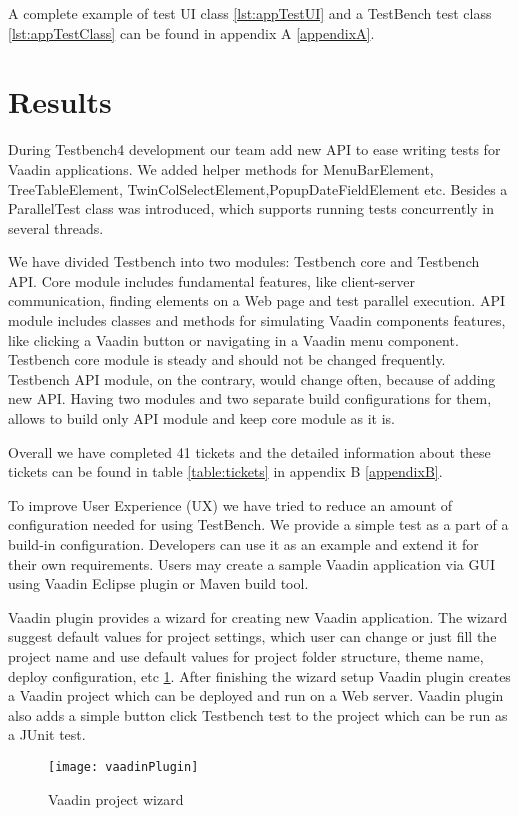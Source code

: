 A complete example of test UI class \ref{lst:appTestUI}  and a TestBench test
class \ref{lst:appTestClass} can be found in appendix A \ref{appendixA}.

\section {Results}
During Testbench4 development our team add new API to ease writing tests for
Vaadin applications. We added helper methods for MenuBarElement,
TreeTableElement, TwinColSelectElement,PopupDateFieldElement etc. Besides a
ParallelTest class was introduced, which supports running tests concurrently in
several threads.

We have divided Testbench into two modules: Testbench core and Testbench API.
Core module includes fundamental features, like client-server communication, finding
elements on a Web page and test parallel execution. API module includes
classes and methods for simulating Vaadin components features, like clicking a
Vaadin button or navigating in a Vaadin menu component. Testbench core
module is steady and should not be changed frequently. Testbench API
module, on the contrary, would change often, because of adding new API. Having
two modules and two separate build configurations for them, allows to build only
API module and keep core module as it is. 

Overall we have completed 41 tickets
and the detailed information about these tickets can be found in table \ref{table:tickets} in appendix B \ref{appendixB}.

To improve User Experience (UX) we have tried to reduce an amount of
configuration needed for using TestBench. We provide a simple test as a
part of a build-in configuration.
Developers can use it as an example and extend it for their own requirements. Users may create a sample
Vaadin application via GUI using Vaadin Eclipse plugin or Maven build tool.

Vaadin plugin provides a wizard for creating new Vaadin application. The wizard
suggest default values for project settings, which user can change or just fill
the project name and use default values for project folder structure, theme
name, deploy configuration, etc \ref{fig:vaadinPlugin}. After finishing the
wizard setup Vaadin plugin creates a Vaadin project which can be
deployed and run on a Web server. Vaadin plugin also adds a simple button click
Testbench test to the project which can be run as a JUnit test.
  \begin{figure}
  \centering
  \texttt{[image: vaadinPlugin]}
  \caption{Vaadin project wizard}
  \label{fig:vaadinPlugin}
  \end{figure}

